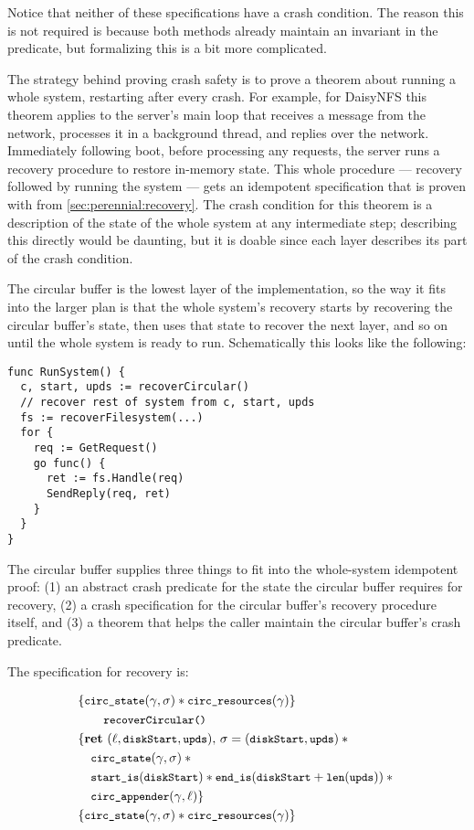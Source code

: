 Notice that neither of these specifications have a crash condition. The reason
this is not required is because both methods already maintain an invariant in
the  predicate, but formalizing this is a bit more
complicated.

The strategy behind proving crash safety is to prove a theorem about running a
whole system, restarting after every crash. For example, for DaisyNFS this
theorem applies to the server's main loop that receives a message from the
network, processes it in a background thread, and replies over the network.
Immediately following boot, before processing any requests, the server runs a
recovery procedure to restore in-memory state. This whole procedure --- recovery
followed by running the system --- gets an idempotent specification that is
proven with  from \autoref{sec:perennial:recovery}. The
crash condition for this theorem is a description of the state of the whole
system at any intermediate step; describing this directly would be daunting, but
it is doable since each layer describes its part of the crash condition.

The circular buffer is the lowest layer of the implementation, so the way it
fits into the larger plan is that the whole system's recovery starts by
recovering the circular buffer's state, then uses that state to recover the next
layer, and so on until the whole system is ready to run. Schematically this
looks like the following:

\begin{verbatim}
func RunSystem() {
  c, start, upds := recoverCircular()
  // recover rest of system from c, start, upds
  fs := recoverFilesystem(...)
  for {
    req := GetRequest()
    go func() {
      ret := fs.Handle(req)
      SendReply(req, ret)
    }
  }
}
\end{verbatim}

The circular buffer supplies three things to fit into the whole-system
idempotent proof: (1) an abstract crash predicate for the state the circular
buffer requires for recovery, (2) a crash specification for the circular
buffer's recovery procedure itself, and (3) a theorem that helps the caller
maintain the circular buffer's crash predicate.

The specification for recovery is:

\begin{align*}
  &\{ \circstate(\gamma, \sigma) \sep \cc{circ_resources}(\gamma) \} \\
  &\qquad\cc{recoverCircular()} \\
  &\{ \Ret{(\ell, \cc{diskStart}, \cc{upds})} \sigma = (\cc{diskStart}, \cc{upds}) \sep {} \\
  &\quad \circstate(\gamma, \sigma) \sep {}  \\
  &\quad \startIs(\cc{diskStart}) \sep \diskendIs(\cc{diskStart} + \cc{len}(\cc{upds})) \sep {} \\
  &\quad \cc{circ_appender}(\gamma, \ell) \} \\
  &\{ \circstate(\gamma, \sigma) \sep \cc{circ_resources}(\gamma) \} \\
\end{align*}

